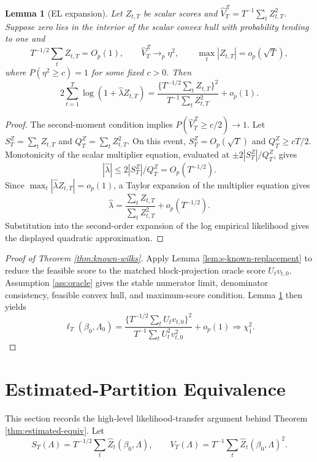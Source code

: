 \documentclass[10pt]{book}
\numberwithin{equation}{section}
\newtheorem{lemma}{Lemma}
\theoremstyle{definition}
\begin{document}
\begin{lemma}[EL expansion]
\label{lem:s-el-expansion}
Let \(Z_{t,T}\) be scalar scores and \(\widehat V_T^Z=T^{-1}\sum_tZ_{t,T}^2\). Suppose zero lies in the interior of the scalar convex hull with probability tending to one and
\[
    T^{-1/2}\sum_t Z_{t,T}=O_p(1),
    \qquad
    \widehat V_T^Z\to_p\eta^2,
    \qquad
    \max_t|Z_{t,T}|=o_p(\sqrt T),
\]
where \(P(\eta^2\geq c)=1\) for some fixed \(c>0\). Then
\[
    2\sum_{t=1}^T\log(1+\widehat\lambda Z_{t,T})
    =
    \frac{\{T^{-1/2}\sum_tZ_{t,T}\}^2}
         {T^{-1}\sum_tZ_{t,T}^2}
    +o_p(1).
\]
\end{lemma}

\begin{proof}
The second-moment condition implies \(P(\widehat V_T^Z\geq c/2)\to1\). Let \(S_T^Z=\sum_tZ_{t,T}\) and \(Q_T^Z=\sum_tZ_{t,T}^2\). On this event, \(S_T^Z=O_p(\sqrt T)\) and \(Q_T^Z\geq cT/2\). Monotonicity of the scalar multiplier equation, evaluated at \(\pm 2|S_T^Z|/Q_T^Z\), gives
\[
    |\widehat\lambda|
    \leq
    2|S_T^Z|/Q_T^Z
    =O_p(T^{-1/2}).
\]
Since \(\max_t|\widehat\lambda Z_{t,T}|=o_p(1)\), a Taylor expansion of the multiplier equation gives
\[
    \widehat\lambda
    =
    \frac{\sum_t Z_{t,T}}{\sum_t Z_{t,T}^2}
    +o_p(T^{-1/2}).
\]
Substitution into the second-order expansion of the log empirical likelihood gives the displayed quadratic approximation.
\end{proof}

\begin{proof}[Proof of Theorem \ref*{thm:known-wilks}]
Apply Lemma \ref{lem:s-known-replacement} to reduce the feasible score to the matched block-projection oracle score \(U_tv_{t,0}\). Assumption \ref*{ass:oracle} gives the stable numerator limit, denominator consistency, feasible convex hull, and maximum-score condition. Lemma \ref{lem:s-el-expansion} then yields
\[
    \ell_T(\beta_0,\Lambda_0)
    =
    \frac{\{T^{-1/2}\sum_tU_tv_{t,0}\}^2}
         {T^{-1}\sum_tU_t^2v_{t,0}^2}
    +o_p(1)
    \Rightarrow\chi_1^2.
\]
\end{proof}

\section{Estimated-Partition Equivalence}

This section records the high-level likelihood-transfer argument behind Theorem \ref*{thm:estimated-equiv}. Let
\[
    S_T(\Lambda)=T^{-1/2}\sum_t\widehat Z_t(\beta_0,\Lambda),
    \qquad
    V_T(\Lambda)=T^{-1}\sum_t\widehat Z_t(\beta_0,\Lambda)^2.
\]
\end{document}
